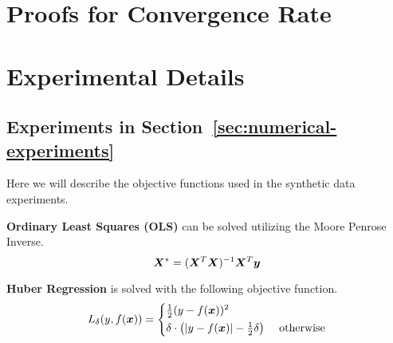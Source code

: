 \documentclass{article} %
\begin{document}
\begin{appendices}
	\section{Proofs for Convergence Rate}
	
	\section{Experimental Details}\label{app:experimental-details}
	\subsection{Experiments in Section~\ref{sec:numerical-experiments}}
	Here we will describe the objective functions used in the synthetic data experiments.
	
	\textbf{Ordinary Least Squares (OLS)} can be solved utilizing the Moore Penrose Inverse.\\
	\begin{equation}\label{eqn:OLS}
		{\bm{X}}^* = ({\bm{X}}^T {\bm{X}})^{-1}{\bm{X}}^T {\bm{y}}
	\end{equation}
	
	\textbf{Huber Regression} is solved with the following objective function.\\
	\begin{equation}\label{eqn:Huber}
		L_\delta (y,f(\vx)) = 
		\begin{cases*}
			\frac{1}{2}(y-f(\vx))^2 & \\
			\delta \cdot \left(|y-f(\vx)| - \frac{1}{2}\delta\right) & \text{ otherwise}\\
		\end{cases*}
	\end{equation}	
	
	\end{appendices}
\end{document}
